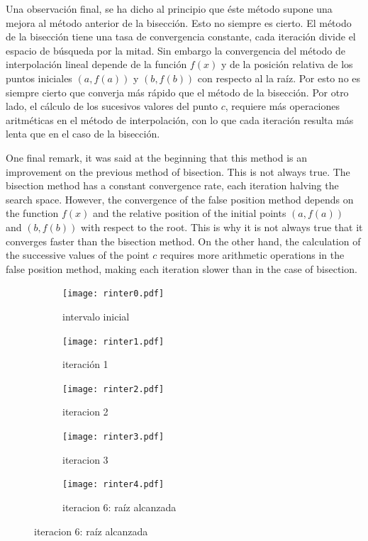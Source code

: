 \begin{paracol}{2}

Una observación final, se ha dicho al principio que éste método supone una mejora al método anterior de la bisección. Esto no siempre es cierto. El método de la bisección tiene una tasa de convergencia constante, cada iteración divide el espacio de búsqueda por la mitad. Sin embargo la convergencia del método de interpolación  lineal depende de la función $f(x)$ y de la posición relativa de los puntos iniciales $(a, f(a))$  y $(b, f(b))$ con respecto al la raíz. Por esto no es siempre cierto que converja más rápido que el método de  la bisección. Por otro lado, el cálculo de los sucesivos valores del punto $c$, requiere más operaciones aritméticas en el método de interpolación, con lo que cada iteración resulta más lenta que en el caso de la bisección.

\switchcolumn

One final remark, it was said at the beginning that this method is an improvement on the previous method of bisection. This is not always true. The bisection method has a constant convergence rate, each iteration halving the search space. However, the convergence of the false position method depends on the function $f(x)$ and the relative position of the initial points $(a, f(a))$ and $(b, f(b))$ with respect to the root. This is why it is not always true that it converges faster than the bisection method. On the other hand, the calculation of the successive values of the point $c$ requires more arithmetic operations in the false position method, making each iteration slower than in the case of bisection.

\end{paracol}
\begin{figure}
	\centering
	\begin{subfigure}{0.4\textwidth}
		{\texttt{[image: rinter0.pdf]}}
		\caption{intervalo inicial}
	\end{subfigure}
	\begin{subfigure}{0.4\textwidth}
		{\texttt{[image: rinter1.pdf]}}
		\caption{iteración 1}
	\end{subfigure}	
	\begin{subfigure}{0.4\textwidth}
		{\texttt{[image: rinter2.pdf]}}
		\caption{iteracion 2}
	\end{subfigure}
	\begin{subfigure}{0.4\textwidth}
		{\texttt{[image: rinter3.pdf]}}
		\caption{iteracion 3}
	\end{subfigure}
	\begin{subfigure}{0.4\textwidth}
		{\texttt{[image: rinter4.pdf]}}
		\caption{iteracion 6: raíz alcanzada}
	\end{subfigure}
	\label{fig:iterr2}
\end{figure}
